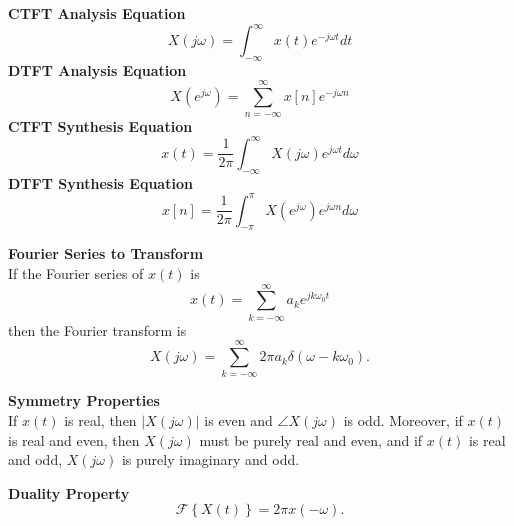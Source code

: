 \documentclass[8pt]{article}
\begin{document}
\begin{multicols}{2}












    \noindent\textbf{CTFT Analysis Equation}
    \begin{equation} \label{eq:ctft_analysis}
        X(j\omega) = \int_{-\infty}^{\infty} x(t) e^{-j\omega t} dt
    \end{equation}
    \noindent\textbf{DTFT Analysis Equation}
    \begin{equation} \label{eq:dtft_analysis}
        X(e^{j\omega}) = \sum_{n=-\infty}^{\infty} x[n] e^{-j\omega n}
    \end{equation}
    \noindent\textbf{CTFT Synthesis Equation}
    \begin{equation} \label{eq:ctft_synthesis}
        x(t) = \frac{1}{2\pi} \int_{-\infty}^{\infty} X(j\omega) e^{j\omega t} d\omega
    \end{equation}
    \noindent\textbf{DTFT Synthesis Equation}
    \begin{equation} \label{eq:dtft_synthesis}
        x[n] = \frac{1}{2\pi} \int_{-\pi}^{\pi} X(e^{j\omega}) e^{j\omega n} d\omega
    \end{equation}

    \noindent\textbf{Fourier Series to Transform} \\
    If the Fourier series of $x(t)$ is
    \begin{equation} \label{eq:fourier_series}
        x(t) = \sum_{k=-\infty}^{\infty} a_k e^{jk\omega_0 t}
    \end{equation}
    then the Fourier transform is
    \begin{equation} \label{eq:fs_to_ft}
        X(j\omega) = \sum_{k=-\infty}^{\infty} 2\pi a_k \delta(\omega - k\omega_0).
    \end{equation}

    \noindent\textbf{Symmetry Properties} \\
    If $x(t)$ is real, then $|X(j\omega)|$ is even and
    $\angle X(j\omega)$ is odd. Moreover, if $x(t)$ is real
    and even, then $X(j\omega)$ must be purely real and even,
    and if $x(t)$ is real and odd, $X(j\omega)$ is purely
    imaginary and odd.

    \noindent\textbf{Duality Property}
    \begin{equation} \label{eq:duality}
        \mathcal{F}\left\{ X(t) \right\} = 2\pi x(-\omega).
    \end{equation}


\end{multicols}
\end{document}
